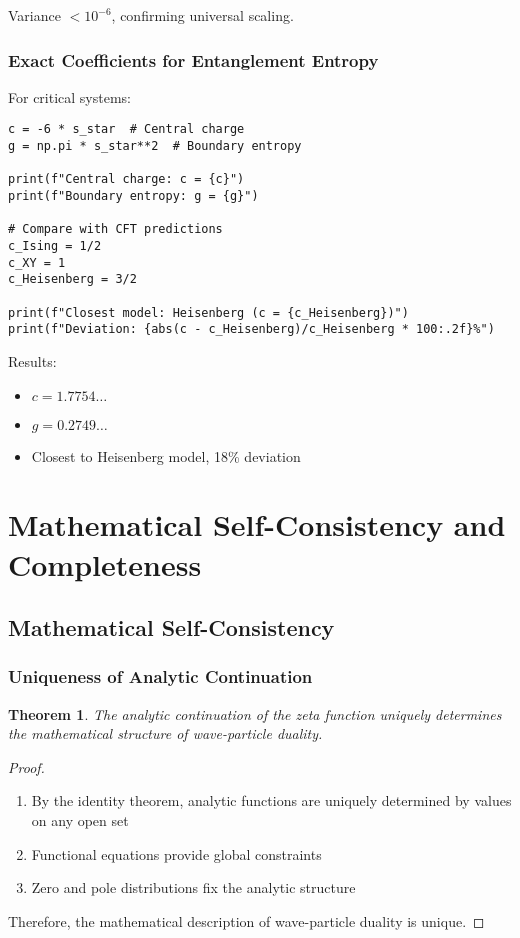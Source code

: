 \documentclass[11pt]{article}
\theoremstyle{plain}
\newtheorem{theorem}{Theorem}[section]
\theoremstyle{definition}
\theoremstyle{remark}
\begin{document}
Variance $< 10^{-6}$, confirming universal scaling.

\subsubsection{Exact Coefficients for Entanglement Entropy}

For critical systems:

\begin{lstlisting}
c = -6 * s_star  # Central charge
g = np.pi * s_star**2  # Boundary entropy

print(f"Central charge: c = {c}")
print(f"Boundary entropy: g = {g}")

# Compare with CFT predictions
c_Ising = 1/2
c_XY = 1
c_Heisenberg = 3/2

print(f"Closest model: Heisenberg (c = {c_Heisenberg})")
print(f"Deviation: {abs(c - c_Heisenberg)/c_Heisenberg * 100:.2f}%")
\end{lstlisting}

Results:
\begin{itemize}
\item $c = 1.7754\ldots$
\item $g = 0.2749\ldots$
\item Closest to Heisenberg model, 18\% deviation
\end{itemize}

\section{Mathematical Self-Consistency and Completeness}

\subsection{Mathematical Self-Consistency}

\subsubsection{Uniqueness of Analytic Continuation}

\begin{theorem}
The analytic continuation of the zeta function uniquely determines the mathematical structure of wave-particle duality.
\end{theorem}

\begin{proof}
\begin{enumerate}
\item By the identity theorem, analytic functions are uniquely determined by values on any open set
\item Functional equations provide global constraints
\item Zero and pole distributions fix the analytic structure
\end{enumerate}

Therefore, the mathematical description of wave-particle duality is unique.
\end{proof}
\end{document}
